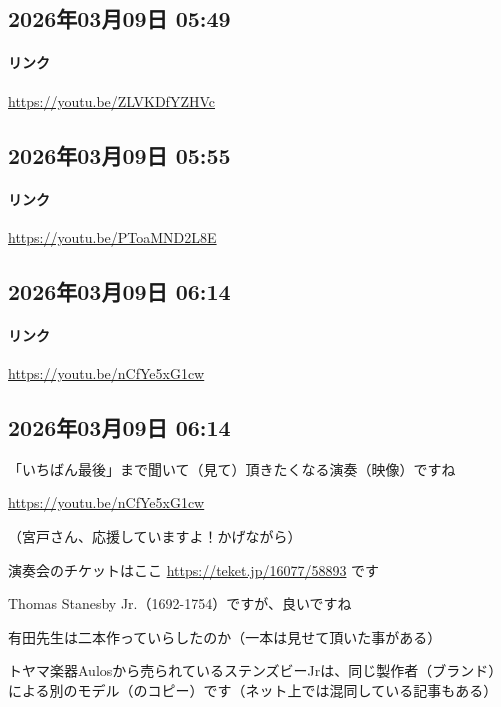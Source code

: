 \subsection*{2026年03月09日 05:49}

\paragraph{リンク}
\url{https://youtu.be/ZLVKDfYZHVc}

\subsection*{2026年03月09日 05:55}

\paragraph{リンク}
\url{https://youtu.be/PToaMND2L8E}

\subsection*{2026年03月09日 06:14}

\paragraph{リンク}
\url{https://youtu.be/nCfYe5xG1cw}

\subsection*{2026年03月09日 06:14}

「いちばん最後」まで聞いて（見て）頂きたくなる演奏（映像）ですね

\url{https://youtu.be/nCfYe5xG1cw}

（宮戸さん、応援していますよ！かげながら）

演奏会のチケットはここ \url{https://teket.jp/16077/58893} です

Thomas Stanesby Jr.（1692-1754）ですが、良いですね

有田先生は二本作っていらしたのか（一本は見せて頂いた事がある）

トヤマ楽器Aulosから売られているステンズビーJrは、同じ製作者（ブランド）による別のモデル（のコピー）です（ネット上では混同している記事もある）

